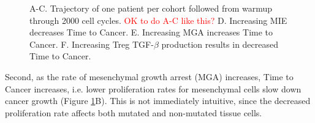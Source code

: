 \documentclass[11pt, preprint]{article}
\newcommand{\tcr} { \textcolor{red} }
\begin{document}
\begin{figure}[H]
\center
{}
\caption{
A-C. Trajectory of one patient per cohort followed from warmup through 2000 cell cycles.
\tcr{OK to do A-C like this?}
D. Increasing MIE decreases Time to Cancer. 
E. Increasing MGA increases Time to Cancer.
F. Increasing Treg TGF-$\beta$ production results in decreased Time to Cancer.
}
\label{fig:FirstSurvivalCurves}
\end{figure}

Second, as the rate of mesenchymal growth arrest (MGA) increases, Time to Cancer increases, i.e. lower proliferation rates for mesenchymal cells slow down cancer growth (Figure \ref{fig:FirstSurvivalCurves}B).
This is not immediately intuitive, since the decreased proliferation rate affects both mutated and non-mutated tissue cells.
\end{document}

